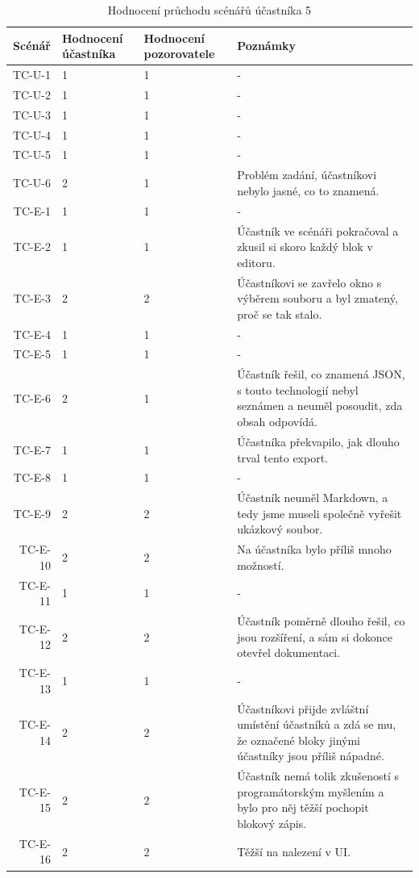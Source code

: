 \begin{longtable}{r|p{2cm}|p{2cm}|p{6cm}}
    \caption{Hodnocení průchodu scénářů účastníka 5}\label{tab:hodnoceniPruchoduUcastnika5}\\
Scénář & Hodnocení účastníka & Hodnocení pozorovatele & Poznámky\\\hline\hline
TC-U-1   & 1 & 1 & - \\\hline
TC-U-2   & 1 & 1 & - \\\hline
TC-U-3   & 1 & 1 & - \\\hline
TC-U-4   & 1 & 1 & - \\\hline
TC-U-5   & 1 & 1 & - \\\hline
TC-U-6   & 2 & 1 & Problém zadání, účastníkovi nebylo jasné, co to znamená. \\\hline
TC-E-1   & 1 & 1 & - \\\hline
TC-E-2   & 1 & 1 & Účastník ve scénáři pokračoval a zkusil si skoro každý blok v editoru. \\\hline
TC-E-3   & 2 & 2 & Účastníkovi se zavřelo okno s výběrem souboru a byl zmatený, proč se tak stalo. \\\hline
TC-E-4   & 1 & 1 & - \\\hline
TC-E-5   & 1 & 1 & - \\\hline
TC-E-6   & 2 & 1 & Účastník řešil, co znamená JSON, s touto technologií nebyl seznámen a neuměl posoudit, zda obsah odpovídá. \\\hline
TC-E-7   & 1 & 1 & Účastníka překvapilo, jak dlouho trval tento export. \\\hline
TC-E-8   & 1 & 1 & - \\\hline
TC-E-9   & 2 & 2 & Účastník neuměl Markdown, a tedy jsme museli společně vyřešit ukázkový soubor. \\\hline
TC-E-10  & 2 & 2 & Na účastníka bylo příliš mnoho možností. \\\hline
TC-E-11  & 1 & 1 & - \\\hline
TC-E-12  & 2 & 2 & Účastník poměrně dlouho řešil, co jsou rozšíření, a sám si dokonce otevřel dokumentaci. \\\hline
TC-E-13  & 1 & 1 & - \\\hline
TC-E-14  & 2 & 2 & Účastníkovi přijde zvláštní umístění účastníků a zdá se mu, že označené bloky jinými účastníky jsou příliš nápadné. \\\hline
TC-E-15  & 2 & 2 & Účastník nemá tolik zkušeností s programátorským myšlením a bylo pro něj těžší pochopit blokový zápis. \\\hline
TC-E-16  & 2 & 2 & Těžší na nalezení v UI. \\\hline

\end{longtable}
